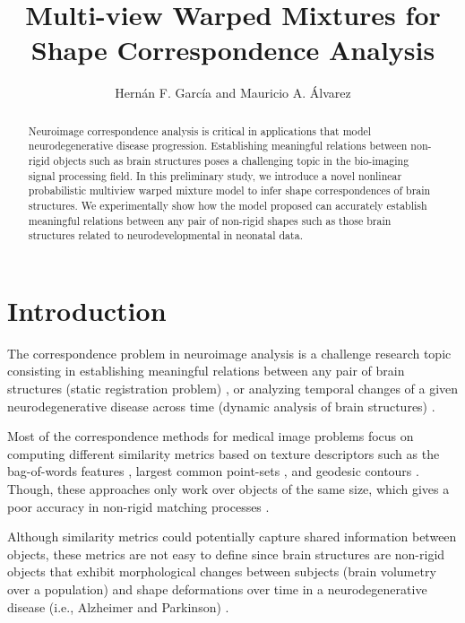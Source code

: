 \documentclass[]{article}
\title{Multi-view Warped Mixtures for Shape Correspondence Analysis}
\author{Hern\'an F. Garc\'ia and Mauricio A. \'Alvarez}
\begin{document}
\maketitle

\begin{abstract}
Neuroimage correspondence analysis is critical in applications that model neurodegenerative disease progression. Establishing meaningful relations between non-rigid objects such as brain structures poses a challenging topic in the bio-imaging signal processing field.  In this preliminary study, we introduce a novel nonlinear probabilistic multiview warped mixture model to infer shape correspondences of brain structures. We experimentally show how the model proposed can accurately establish meaningful relations between any pair of non-rigid shapes such as those brain structures related to neurodevelopmental in neonatal data.
\end{abstract}

\section{Introduction}


The correspondence problem in neuroimage analysis is a challenge research topic consisting in establishing
meaningful relations between any pair of brain structures (static registration problem) \cite{LinCW14}, or analyzing
temporal changes of a given neurodegenerative disease across time (dynamic analysis of brain structures)
\cite{durrleman2014}. 

Most of the correspondence methods for medical image problems focus on computing different similarity metrics based on
texture descriptors such as the bag-of-words features \cite{Bronstein11}, largest common point-sets \cite{Aiger08}, and
geodesic contours \cite{LiangSW15}. Though, these approaches only work over objects of the same size, which gives a poor accuracy in non-rigid matching processes \cite{Brunton14}.

Although similarity metrics could potentially capture shared information between objects, these metrics
are not easy to define \cite{CortesS15} since brain structures are non-rigid
objects that exhibit morphological changes between subjects (brain volumetry over a population) and shape deformations
over time in a neurodegenerative disease (i.e., Alzheimer and Parkinson) \cite{Cosa13}.
\end{document}
